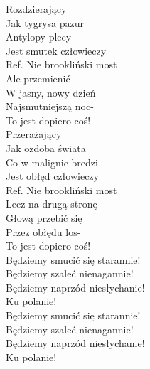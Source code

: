 Rozdzierający \tab{}\\
Jak tygrysa pazur \\
Antylopy plecy  \\
Jest smutek człowieczy \\
\hops
Ref. Nie brookliński most \\
 Ale przemienić \\
 W jasny, nowy dzień \\
 Najsmutniejszą noc- \\
 To jest dopiero coś! \\
\hops
Przerażający \\
Jak ozdoba świata \\
Co w malignie bredzi \\
Jest obłęd człowieczy \\
\hops
Ref. Nie brookliński most\\
 Lecz na drugą stronę \\
 Głową przebić się \\
 Przez obłędu los- \\
 To jest dopiero coś! \\
\hops
{} {} Będziemy smucić się starannie! \\
 {} Będziemy szaleć nienagannie! \\
 {} Będziemy naprzód niesłychanie! \\
 {} Ku polanie! \tab{} \\
\hops
{} {} Będziemy smucić się starannie! \\
 {} Będziemy szaleć nienagannie! \\
 {} Będziemy naprzód niesłychanie! \\
 {} Ku polanie!